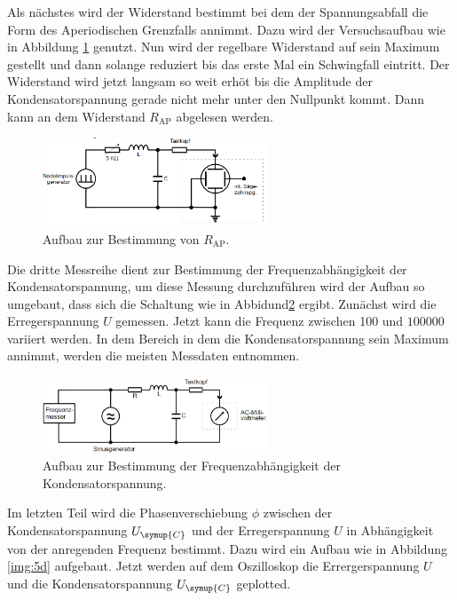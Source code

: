 \noindent Als nächstes wird der Widerstand bestimmt bei dem der Spannungsabfall die Form des Aperiodischen Grenzfalls annimmt. Dazu wird der 
Versuchsaufbau wie in Abbildung \ref{img:5b} genutzt. Nun wird der regelbare Widerstand auf sein Maximum gestellt und dann solange reduziert bis
das erste Mal ein Schwingfall eintritt. Der Widerstand wird jetzt langsam so weit erhöt bis die Amplitude der Kondensatorspannung gerade nicht mehr 
unter den Nullpunkt kommt. Dann kann an dem Widerstand $R_{\text{AP}}$ abgelesen werden.

\begin{figure}[H]
    \centering
    \includegraphics[width=0.6\textwidth]{images/5b.PNG}
    \caption{Aufbau zur Bestimmung von $R_{\text{AP}}$.}
    \label{img:5b}
\end{figure}


\noindent Die dritte Messreihe dient zur Bestimmung der Frequenzabhängigkeit der Kondensatorspannung, um diese Messung durchzuführen wird der 
Aufbau so umgebaut, dass sich die Schaltung wie in Abbidund\ref{img:5c} ergibt. Zunächst wird die Erregerspannung $U$ gemessen. Jetzt kann die 
Frequenz zwischen 100 und $\num{100000}$ variiert werden. In dem Bereich in dem die Kondensatorspannung sein Maximum annimmt, werden die 
meisten Messdaten entnommen.

\begin{figure}[H]
    \centering
    \includegraphics[width=0.6\textwidth]{images/5c.PNG}
    \caption{Aufbau zur Bestimmung der Frequenzabhängigkeit der Kondensatorspannung.}
    \label{img:5c}
\end{figure}

\noindent Im letzten Teil wird die Phasenverschiebung $\phi$ zwischen der Kondensatorspannung $U_{\symup{C}}$ und der Erregerspannung $U$ in 
Abhängigkeit von der anregenden Frequenz bestimmt. Dazu wird ein Aufbau wie in Abbildung \ref{img:5d} aufgebaut. Jetzt werden auf dem Oszilloskop
die Errergerspannung $U$ und die Kondensatorspannung $U_{\symup{C}}$ geplotted. 


